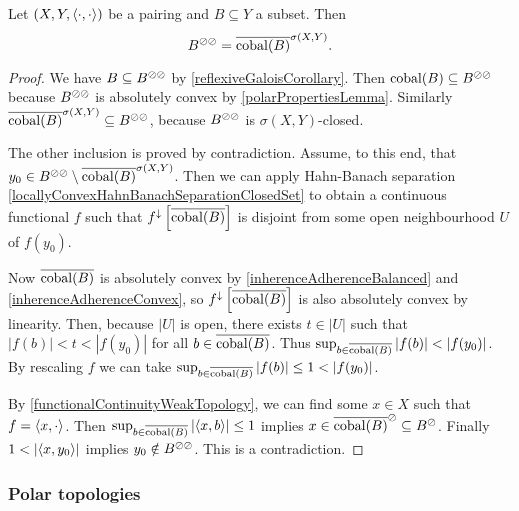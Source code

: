 \begin{proposition} \label{bipolarTheorem}
Let $\left( X,Y,\left\langle \cdot,\cdot \right\rangle \right)$ be a pairing and $B\subseteq Y$ a subset. Then
\[ B^{\oslash\oslash} = \overline{\operatorname{cobal}(B)}^{\sigma(X,Y)}. \]
\end{proposition}
\begin{proof}
We have $B\subseteq B^{\oslash\oslash}$ by \ref{reflexiveGaloisCorollary}. Then $\operatorname{cobal}(B) \subseteq B^{\oslash\oslash}$ because $B^{\oslash\oslash}$ is absolutely convex by \ref{polarPropertiesLemma}. Similarly $\overline{\operatorname{cobal}(B)}^{\sigma(X,Y)} \subseteq B^{\oslash\oslash}$, because $B^{\oslash\oslash}$ is $\sigma(X,Y)$-closed.

The other inclusion is proved by contradiction. Assume, to this end, that $y_0\in B^{\oslash\oslash} \setminus \overline{\operatorname{cobal}(B)}^{\sigma(X,Y)}$. Then we can apply Hahn-Banach separation \ref{locallyConvexHahnBanachSeparationClosedSet} to obtain a continuous functional $f$ such that $f^\downarrow\left[\overline{\operatorname{cobal}(B)}\right]$ is disjoint from some open neighbourhood $U$ of $f(y_0)$.

Now $\overline{\operatorname{cobal}(B)}$ is absolutely convex by \ref{inherenceAdherenceBalanced} and \ref{inherenceAdherenceConvex}, so $f^\downarrow\left[\overline{\operatorname{cobal}(B)}\right]$ is also absolutely convex by linearity. Then, because $|U|$ is open, there exists $t\in |U|$ such that $|f(b)| < t < |f(y_0)|$ for all $b\in \overline{\operatorname{cobal}(B)}$. Thus $\sup_{b\in \overline{\operatorname{cobal}(B)}}|f(b)| < |f(y_0)|$. By rescaling $f$ we can take $\sup_{b\in \overline{\operatorname{cobal}(B)}}|f(b)| \leq 1 < |f(y_0)|$.

By \ref{functionalContinuityWeakTopology}, we can find some $x\in X$ such that $f = \left\langle x,\cdot \right\rangle$. Then $\sup_{b\in \overline{\operatorname{cobal}(B)}}\left|\left\langle x, b \right\rangle\right| \leq 1$ implies $x\in \overline{\operatorname{cobal}(B)}^\oslash \subseteq B^\oslash$. Finally $1 < \left|\left\langle x, y_0 \right\rangle\right|$ implies $y_0\notin B^{\oslash\oslash}$. This is a contradiction.
\end{proof}


\subsubsection{Polar topologies}

